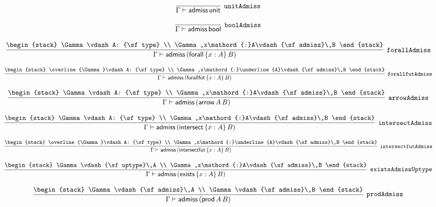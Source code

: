 \[
\infer[{\tt unitAdmiss}]{\Gamma \vdash {\sf admiss}\,{\sf unit}}{}
\]

\[
\infer[{\tt boolAdmiss}]{\Gamma \vdash {\sf admiss}\,{\sf bool}}{}
\]

\[
\infer[{\tt forallAdmiss}]{\Gamma \vdash {\sf admiss}\,({\sf forall}\,\{x : A\}\,B)}{
\begin{stack}
\Gamma \vdash A: {\sf type}
\\
\Gamma ,x\mathord{:}A\vdash {\sf admiss}\,B
\end{stack}}
\]

\[
\infer[{\tt forallfutAdmiss}]{\Gamma \vdash {\sf admiss}\,({\sf forallfut}\,\{x : A\}\,B)}{
\begin{stack}
\overline{\Gamma}\vdash A: {\sf type}
\\
\Gamma ,x\mathord{:}\underline{A}\vdash {\sf admiss}\,B
\end{stack}}
\]

\[
\infer[{\tt arrowAdmiss}]{\Gamma \vdash {\sf admiss}\,({\sf arrow}\,A\,B)}{
\begin{stack}
\Gamma \vdash A: {\sf type}
\\
\Gamma ,x\mathord{:}A\vdash {\sf admiss}\,B
\end{stack}}
\]

\[
\infer[{\tt intersectAdmiss}]{\Gamma \vdash {\sf admiss}\,({\sf intersect}\,\{x : A\}\,B)}{
\begin{stack}
\Gamma \vdash A: {\sf type}
\\
\Gamma ,x\mathord{:}A\vdash {\sf admiss}\,B
\end{stack}}
\]

\[
\infer[{\tt intersectfutAdmiss}]{\Gamma \vdash {\sf admiss}\,({\sf intersectfut}\,\{x : A\}\,B)}{
\begin{stack}
\overline{\Gamma}\vdash A: {\sf type}
\\
\Gamma ,x\mathord{:}\underline{A}\vdash {\sf admiss}\,B
\end{stack}}
\]

\[
\infer[{\tt existsAdmissUptype}]{\Gamma \vdash {\sf admiss}\,({\sf exists}\,\{x : A\}\,B)}{
\begin{stack}
\Gamma \vdash {\sf uptype}\,A
\\
\Gamma ,x\mathord{:}A\vdash {\sf admiss}\,B
\end{stack}}
\]

\[
\infer[{\tt prodAdmiss}]{\Gamma \vdash {\sf admiss}\,({\sf prod}\,A\,B)}{
\begin{stack}
\Gamma \vdash {\sf admiss}\,A
\\
\Gamma \vdash {\sf admiss}\,B
\end{stack}}
\]

